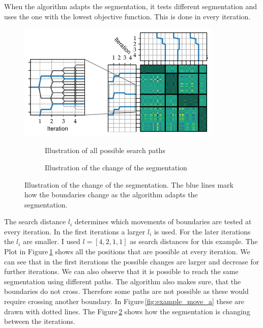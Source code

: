 \documentclass[doctype=mastersthesis,BCOR=15mm,biblatex]{ldvbook}%
\begin{document}
When the algorithm adapts the segmentation, it tests different segmentation and uses the one with the lowest objective function.
This is done in every iteration. 
\begin{figure}[!htb]
	\centering
	\includegraphics[width=0.87\textwidth]{Plots/example_move_iterations.pdf}
	\begin{subfigure}[b]{0.3\textwidth}
		\caption{Illustration of all possible search paths}
		\label{fig:example_move_bound_a}
	\end{subfigure}
	\begin{subfigure}[b]{0.55\textwidth}
		\caption{Illustration of the change of the segmentation}
		\label{fig:example_move_bound_b}
	\end{subfigure}
	\caption{Illustration of the change of the segmentation.
		The blue lines mark how the boundaries change as the algorithm adapts the segmentation.
	}
	\label{fig:example_move_bound}
\end{figure}
The search distance $l_i$ determines which movements of boundaries are tested at every iteration.
In the first iterations a larger $l_i$ is used. 
For the later iterations the $l_i$ are smaller.
I used $l = [4,2,1,1]$ as search distances for this example.
The Plot in Figure\,\ref{fig:example_move_bound_a} shows all the positions that are possible at every iteration.
We can see that in the first iterations the possible changes are larger and decrease for further iterations.
We can also observe that it is possible to reach the same segmentation using different paths.
The algorithm also makes sure, that the boundaries do not cross.
Therefore some paths are not possible as these would require crossing another boundary. 
In Figure\,\ref{fig:example_move_a} these are drawn with dotted lines.
The Figure\,\ref{fig:example_move_bound_b} shows how the segmentation is changing between the iterations. 

\end{document}
